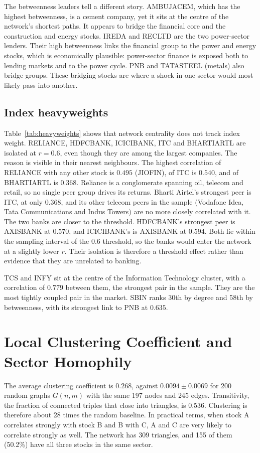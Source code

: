 \documentclass[12pt,a4paper]{report}
\begin{document}
The betweenness leaders tell a different story. AMBUJACEM, which has the highest betweenness, is a cement company, yet it sits at the centre of the network's shortest paths. It appears to bridge the financial core and the construction and energy stocks. IREDA and RECLTD are the two power-sector lenders. Their high betweenness links the financial group to the power and energy stocks, which is economically plausible: power-sector finance is exposed both to lending markets and to the power cycle. PNB and TATASTEEL (metals) also bridge groups. These bridging stocks are where a shock in one sector would most likely pass into another.

\subsection*{Index heavyweights}
Table~\ref{tab:heavyweights} shows that network centrality does not track index weight. RELIANCE, HDFCBANK, ICICIBANK, ITC and BHARTIARTL are isolated at $r=0.6$, even though they are among the largest companies. The reason is visible in their nearest neighbours. The highest correlation of RELIANCE with any other stock is $0.495$ (JIOFIN), of ITC is $0.540$, and of BHARTIARTL is $0.368$. Reliance is a conglomerate spanning oil, telecom and retail, so no single peer group drives its returns. Bharti Airtel's strongest peer is ITC, at only $0.368$, and its other telecom peers in the sample (Vodafone Idea, Tata Communications and Indus Towers) are no more closely correlated with it. The two banks are closer to the threshold. HDFCBANK's strongest peer is AXISBANK at $0.570$, and ICICIBANK's is AXISBANK at $0.594$. Both lie within the sampling interval of the $0.6$ threshold, so the banks would enter the network at a slightly lower $r$. 
Their isolation is therefore a threshold effect rather than evidence that they are unrelated to banking.

TCS and INFY sit at the centre of the Information Technology cluster, with a correlation of $0.779$ between them, the strongest pair in the sample. They are the most tightly coupled pair in the market. SBIN ranks 30th by degree and 58th by betweenness, with its strongest link to PNB at $0.635$.

\section{Local Clustering Coefficient and Sector Homophily}
\label{sec:homophily}

The average clustering coefficient is $0.268$, against $0.0094\pm0.0069$ for 200 random graphs $G(n,m)$ with the same 197 nodes and 245 edges. Transitivity, the fraction of connected triples that close into triangles, is $0.536$. Clustering is therefore about 28 times the random baseline. In practical terms, when stock A correlates strongly with stock B and B with C, A and C are very likely to correlate strongly as well. The network has 309 triangles, and 155 of them (50.2\%) have all three stocks in the same sector.
\end{document}
